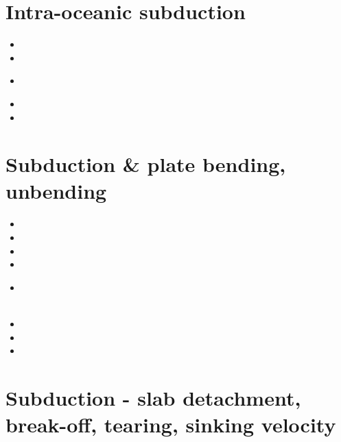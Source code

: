 \section{Intra-oceanic subduction}

\begin{scriptsize}
\begin{itemize}
\item[\twothousandeleven]
\item[\twothousandthirteen]
\item[\twothousandfifteen]
 \\
\item[\twothousandnineteen]
\item[\twothousandtwentytwo]
\end{itemize}
\end{scriptsize}

\section{Subduction \& plate bending, unbending}

\begin{scriptsize}
\begin{itemize}
\item[\nineteenninetynine]
\item[\twothousandsix]
\item[\twothousandeight]
\item[\twothousandnine]
\item[\twothousandtwelve]
 \\
 \\
\item[\twothousandfourteen]
\item[\twothousandnineteen]
\item[\twothousandtwentyone]
\end{itemize}
\end{scriptsize}

\section{Subduction - slab detachment, break-off, tearing, sinking velocity}

